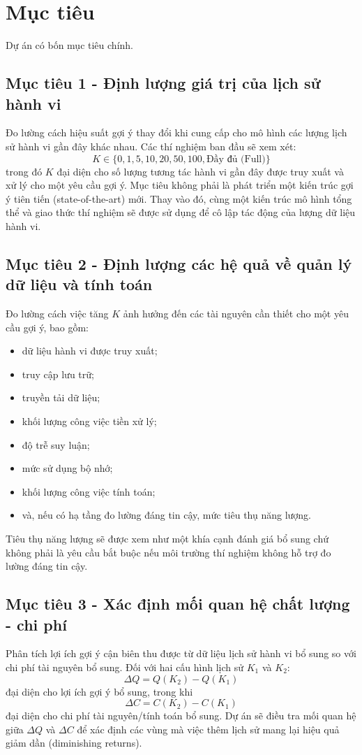 \documentclass[12pt,a4paper]{article}
\begin{document}
\section{Mục tiêu}

Dự án có bốn mục tiêu chính.

\subsection*{Mục tiêu 1 - Định lượng giá trị của lịch sử hành vi}
Đo lường cách hiệu suất gợi ý thay đổi khi cung cấp cho mô hình các lượng lịch sử hành vi gần đây khác nhau. Các thí nghiệm ban đầu sẽ xem xét:
\[ K \in \{0, 1, 5, 10, 20, 50, 100, \text{Đầy đủ (Full)}\} \]
trong đó $K$ đại diện cho số lượng tương tác hành vi gần đây được truy xuất và xử lý cho một yêu cầu gợi ý. 
Mục tiêu không phải là phát triển một kiến trúc gợi ý tiên tiến (state-of-the-art) mới. Thay vào đó, cùng một kiến trúc mô hình tổng thể và giao thức thí nghiệm sẽ được sử dụng để cô lập tác động của lượng dữ liệu hành vi.

\subsection*{Mục tiêu 2 - Định lượng các hệ quả về quản lý dữ liệu và tính toán}
Đo lường cách việc tăng $K$ ảnh hưởng đến các tài nguyên cần thiết cho một yêu cầu gợi ý, bao gồm:
\begin{itemize}
    \item dữ liệu hành vi được truy xuất;
    \item truy cập lưu trữ;
    \item truyền tải dữ liệu;
    \item khối lượng công việc tiền xử lý;
    \item độ trễ suy luận;
    \item mức sử dụng bộ nhớ;
    \item khối lượng công việc tính toán;
    \item và, nếu có hạ tầng đo lường đáng tin cậy, mức tiêu thụ năng lượng.
\end{itemize}
Tiêu thụ năng lượng sẽ được xem như một khía cạnh đánh giá bổ sung chứ không phải là yêu cầu bắt buộc nếu môi trường thí nghiệm không hỗ trợ đo lường đáng tin cậy.

\subsection*{Mục tiêu 3 - Xác định mối quan hệ chất lượng - chi phí}
Phân tích lợi ích gợi ý cận biên thu được từ dữ liệu lịch sử hành vi bổ sung so với chi phí tài nguyên bổ sung.
Đối với hai cấu hình lịch sử $K_1$ và $K_2$:
\[ \Delta Q = Q(K_2) - Q(K_1) \]
đại diện cho lợi ích gợi ý bổ sung, trong khi
\[ \Delta C = C(K_2) - C(K_1) \]
đại diện cho chi phí tài nguyên/tính toán bổ sung.
Dự án sẽ điều tra mối quan hệ giữa $\Delta Q$ và $\Delta C$ để xác định các vùng mà việc thêm lịch sử mang lại hiệu quả giảm dần (diminishing returns).
\end{document}
